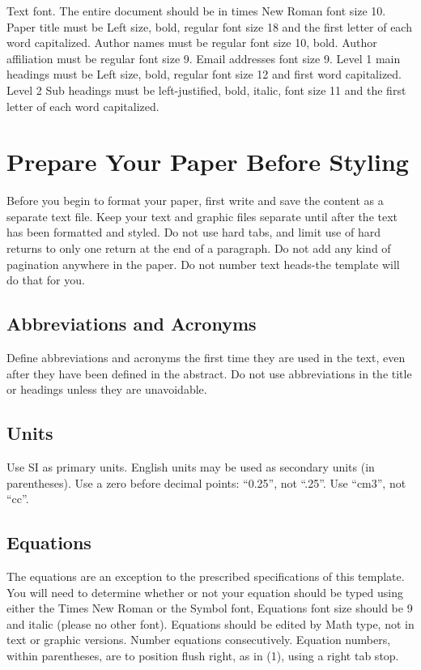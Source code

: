 \documentclass[fleqn,10pt]{thescipub} %
\begin{document}
Text font. The entire document should be in times New Roman font size 10. Paper title must be Left size, bold, regular font size 18 and the first letter of each word capitalized. Author names must be regular font size 10, bold. Author affiliation must be regular font size 9. Email addresses font size 9. Level 1 main headings must be Left size, bold, regular font size 12 and first word capitalized. Level 2 Sub headings must be left-justified, bold, italic, font size 11 and the first letter of each word capitalized.

\section{Prepare Your Paper Before Styling}
Before you begin to format your paper, first write and save the content as a separate text file. Keep your text and graphic files separate until after the text has been formatted and styled. Do not use hard tabs, and limit use of hard returns to only one return at the end of a paragraph. Do not add any kind of pagination anywhere in the paper. Do not number text heads-the template will do that for you.

\subsection{Abbreviations and Acronyms} 
Define abbreviations and acronyms the first time they are used in the text, even after they have been defined in the abstract. Do not use abbreviations in the title or headings unless they are unavoidable.

\subsection{Units} 
Use SI as primary units. English units may be used as secondary units (in parentheses). Use a zero before decimal points: “0.25”, not “.25”. Use “cm3”, not “cc”.

\subsection{Equations} 
The equations are an exception to the prescribed specifications of this template. You will need to determine whether or not your equation should be typed using either the Times New Roman or the Symbol font, Equations font size should be 9 and italic (please no other font). Equations should be edited by Math type, not in text or graphic versions. Number equations consecutively. Equation numbers, within parentheses, are to position flush right, as in (1), using a right tab stop.
\linebreak
\end{document}
